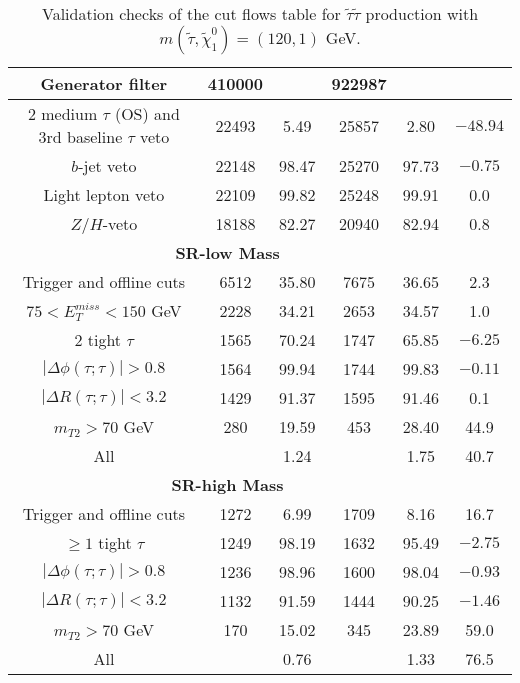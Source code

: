 \documentclass[12pt,A4paper,pdftex, ]{article}
\begin{document}
\begin{table}[h!]
\begin{center}
\begin{tabular}{|c|c|c|c|c|c|}
Generator filter & 410000 &  & 922987 &  & \\ \hline
2 medium $\tau$ (OS) and 3rd baseline $\tau$ veto & 22493 & 5.49 & 25857 & 2.80 & $-48.94$ \\ \hline
$b$-jet veto & 22148 & 98.47 & 25270 & 97.73 & $-0.75$ \\ \hline
Light lepton veto & 22109 & 99.82 & 25248 & 99.91 & 0.0 \\ \hline
$Z/H$-veto & 18188 & 82.27 & 20940 & 82.94 & 0.8 \\ \hline
%
\multicolumn{5}{|c|}{ \textbf{SR-low Mass} }\\\hline
%
Trigger and offline cuts & 6512 & 35.80 & 7675 & 36.65 & 2.3 \\ \hline
$ 75 < E^{miss}_T < 150 $ GeV & 2228 & 34.21 & 2653 & 34.57 & 1.0 \\ \hline
2 tight $\tau$ & 1565 & 70.24 & 1747 & 65.85 & $-6.25$ \\ \hline
$ |\Delta\phi(\tau;\tau)| > 0.8 $ & 1564 & 99.94 & 1744 & 99.83 & $-0.11$ \\ \hline
$ |\Delta R(\tau;\tau)| < 3.2 $ & 1429 & 91.37 & 1595 & 91.46 & 0.1 \\ \hline
$ m_{T2} > 70 $ GeV & 280 & 19.59 & 453 & 28.40 & 44.9 \\ \hline
All &  & 1.24 &  & 1.75 & 40.7 \\ \hline
%
\hline
\multicolumn{5}{|c|}{ \textbf{SR-high Mass} }\\\hline
%
Trigger and offline cuts & 1272 & 6.99 & 1709 & 8.16 & 16.7 \\ \hline
$ \geq 1 $ tight $\tau$ & 1249 & 98.19 & 1632 & 95.49 & $-2.75$ \\ \hline
$ |\Delta\phi(\tau;\tau)| > 0.8 $ & 1236 & 98.96 & 1600 & 98.04 & $-0.93$ \\ \hline
$ |\Delta R(\tau;\tau)| < 3.2 $ & 1132 & 91.59 & 1444 & 90.25 & $-1.46$ \\ \hline
$ m_{T2} > 70 $ GeV & 170 & 15.02 & 345 & 23.89 & 59.0 \\ \hline
All &  & 0.76 &  & 1.33 & 76.5 \\ \hline

\end{tabular}
\end{center}
\caption{Validation checks of the cut flows table for $ \tilde{\tau}\tilde{\tau} $ production with $ m(\tilde{\tau},\tilde{\chi}^0_1) = (120,1) $ GeV.}
\label{120GeV}
\end{table} 
\end{document}
